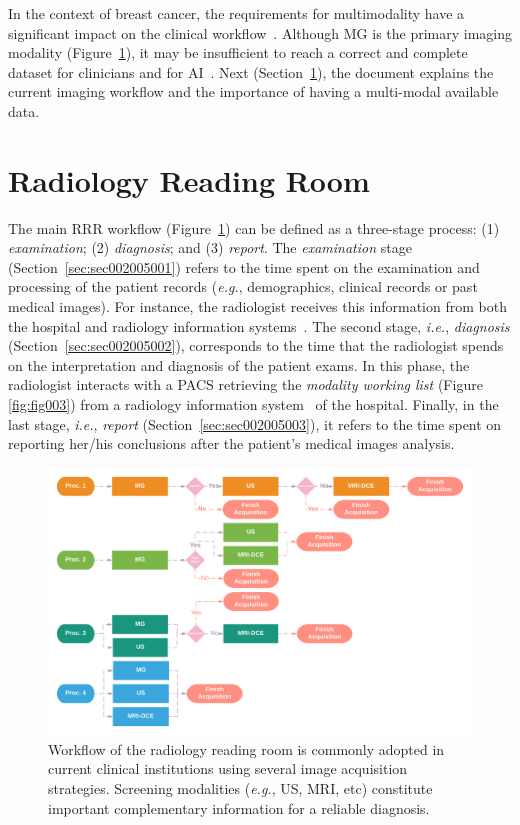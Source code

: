 In the context of breast cancer, the requirements for multimodality have a significant impact on the clinical workflow~\cite{https://doi.org/10.1002/cncr.32910}.
Although \ac{MG} is the primary imaging modality (Figure~\ref{fig:fig018}), it may be insufficient to reach a correct and complete dataset for clinicians and for \ac{AI}~\cite{DANA2020541}.
Next (Section~\ref{sec:sec002005}), the document explains the current imaging workflow and the importance of having a multi-modal available data.

\section{Radiology Reading Room}
\label{sec:sec002005}

The main \ac{RRR} workflow (Figure~\ref{fig:fig018}) can be defined as a three-stage process:
(1) {\it examination};
(2) {\it diagnosis}; and
(3) {\it report}.
The {\it examination} stage (Section~\ref{sec:sec002005001}) refers to the time spent on the examination and processing of the patient records ({\it e.g.}, demographics, clinical records or past medical images).
For instance, the radiologist receives this information from both the hospital and radiology information systems~\cite{islam2018recent}.
The second stage, {\it i.e.}, {\it diagnosis} (Section~\ref{sec:sec002005002}), corresponds to the time that the radiologist spends on the interpretation and diagnosis of the patient exams.
In this phase, the radiologist interacts with a \ac{PACS} retrieving the {\it modality working list} (Figure \ref{fig:fig003}) from a radiology information system~\cite{DIROBERTO2016950} of the hospital.
Finally, in the last stage, {\it i.e.}, {\it report} (Section~\ref{sec:sec002005003}), it refers to the time spent on reporting her/his conclusions after the patient's medical images analysis.

\begin{figure}[htbp]
\centering
\includegraphics[width=\columnwidth]{images/fig018}
\caption{Workflow of the radiology reading room is commonly adopted in current clinical institutions using several image acquisition strategies. Screening modalities ({\it e.g.}, US, MRI, etc) constitute important complementary information for a reliable diagnosis.}
\label{fig:fig018}
\end{figure}

